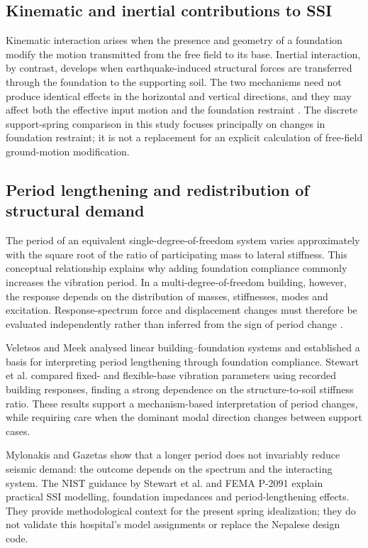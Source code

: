 \subsection*{Kinematic and inertial contributions to SSI}
Kinematic interaction arises when the presence and geometry of a foundation modify the motion transmitted from the free field to its base. Inertial interaction, by contrast, develops when earthquake-induced structural forces are transferred through the foundation to the supporting soil. The two mechanisms need not produce identical effects in the horizontal and vertical directions, and they may affect both the effective input motion and the foundation restraint \cite{wolf1985,kc2025}. The discrete support-spring comparison in this study focuses principally on changes in foundation restraint; it is not a replacement for an explicit calculation of free-field ground-motion modification.

\subsection*{Period lengthening and redistribution of structural demand}
The period of an equivalent single-degree-of-freedom system varies approximately with the square root of the ratio of participating mass to lateral stiffness. This conceptual relationship explains why adding foundation compliance commonly increases the vibration period. In a multi-degree-of-freedom building, however, the response depends on the distribution of masses, stiffnesses, modes and excitation. Response-spectrum force and displacement changes must therefore be evaluated independently rather than inferred from the sign of period change \cite{wolf1985,timilsina2023,poudel2024}.

Veletsos and Meek \cite{veletsos1974} analysed linear building--foundation systems and established a basis for interpreting period lengthening through foundation compliance. Stewart et al. \cite{stewart1999} compared fixed- and flexible-base vibration parameters using recorded building responses, finding a strong dependence on the structure-to-soil stiffness ratio. These results support a mechanism-based interpretation of period changes, while requiring care when the dominant modal direction changes between support cases.

Mylonakis and Gazetas \cite{mylonakis2000} show that a longer period does not invariably reduce seismic demand: the outcome depends on the spectrum and the interacting system. The NIST guidance by Stewart et al. \cite{nist2012ssi} and FEMA P-2091 \cite{fema2091} explain practical SSI modelling, foundation impedances and period-lengthening effects. They provide methodological context for the present spring idealization; they do not validate this hospital's model assignments or replace the Nepalese design code.

